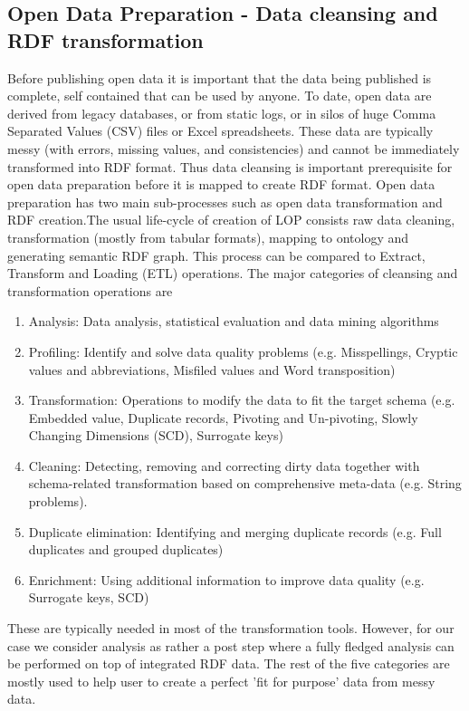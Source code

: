 \subsection{Open Data Preparation - Data cleansing and RDF transformation}
Before publishing open data it is important that the data being published is complete, self contained that can be used by anyone. To date, open data are derived from legacy databases, or from static logs, or\cite{collaborativeopendataversioning} in silos of huge Comma Separated Values (CSV) files or Excel spreadsheets\cite{ETL}. These data are typically messy (with errors, missing values, and consistencies) and cannot be immediately transformed into RDF format. Thus data cleansing is important prerequisite for open data preparation before it is mapped to create RDF format. Open data preparation has two main sub-processes such as open data transformation and RDF creation.The usual life-cycle of creation of LOP consists raw data cleaning, transformation (mostly from tabular formats), mapping to ontology and generating semantic RDF graph\cite{datagraftsimplyfyingopendatapublishing}.  This process can be compared to Extract, Transform and Loading (ETL) operations\cite{collaborativeopendataversioning}. The major categories of cleansing and transformation operations are 
\begin{enumerate}
\item Analysis: Data analysis, statistical evaluation and data mining algorithms
\item Profiling: Identify and solve data quality problems (e.g. Misspellings, Cryptic values and abbreviations, Misfiled values and Word transposition) \cite{datacleaningprobsandapproaches}
\item Transformation: Operations to modify the data to fit the target schema (e.g. Embedded value,  Duplicate records, Pivoting and Un-pivoting, Slowly Changing Dimensions (SCD), Surrogate keys)\cite{datacleaningprobsandapproaches}\cite{ETL}
\item Cleaning: Detecting, removing and correcting dirty data together with schema-related transformation based on comprehensive meta-data (e.g. String problems). \cite{datacleaningprobsandapproaches}
\item Duplicate elimination: Identifying and merging duplicate records (e.g. Full duplicates and grouped duplicates)
\item Enrichment: Using additional information to improve data quality (e.g. Surrogate keys, SCD)\cite{ETL}
\end{enumerate}
These are typically needed in most of the transformation tools. However, for our case we consider analysis as rather a post step where a fully fledged analysis can be performed on top of integrated RDF data. The rest of the five categories are mostly used to help user to create a perfect 'fit for purpose' data from messy data. 

